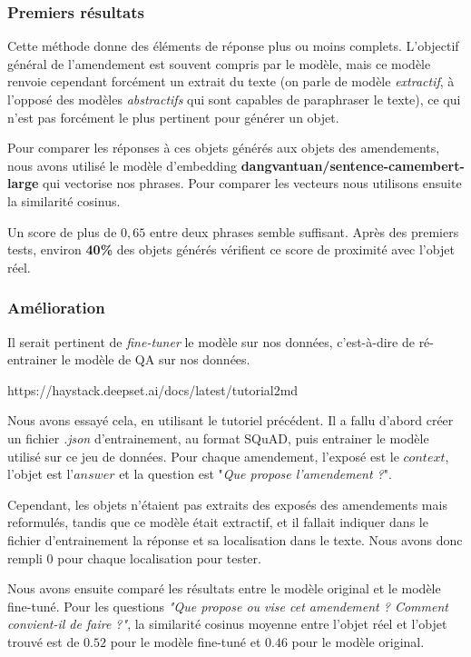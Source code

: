\documentclass{article}
\begin{document}
\subsubsection{Premiers résultats}

Cette méthode donne des éléments de réponse plus ou moins complets. L'objectif général de l'amendement est souvent compris par le modèle, mais ce modèle renvoie cependant forcément un extrait du texte (on parle de modèle \emph{extractif}, à l'opposé des modèles \emph{abstractifs} qui sont capables de paraphraser le texte), ce qui n'est pas forcément le plus pertinent pour générer un objet. 

Pour comparer les réponses à ces objets générés aux objets des amendements, nous avons utilisé le modèle d'embedding \textbf{dangvantuan/sentence-camembert-large} qui vectorise nos phrases. Pour comparer les vecteurs nous utilisons ensuite la similarité cosinus.

Un score de plus de $0,65$ entre deux phrases semble suffisant. Après des premiers tests, environ \textbf{40\%} des objets générés vérifient ce score de proximité avec l'objet réel.


\subsubsection{Amélioration}


Il serait pertinent de \emph{fine-tuner} le modèle sur nos données, c'est-à-dire de ré-entrainer le modèle de QA sur nos données. 

https://haystack.deepset.ai/docs/latest/tutorial2md

Nous avons essayé cela, en utilisant le tutoriel précédent. Il a fallu d'abord créer un fichier \emph{.json} d'entrainement, au format SQuAD, puis entrainer le modèle utilisé sur ce jeu de données. Pour chaque amendement, l'exposé est le $context$, l'objet est l'$answer$ et la question est "\emph{Que propose l'amendement ?}".

Cependant, les objets n'étaient pas extraits des exposés des amendements mais reformulés, tandis que ce modèle était extractif, et il fallait indiquer dans le fichier d'entrainement la réponse et sa localisation dans le texte. Nous avons donc rempli $0$ pour chaque localisation pour tester.


Nous avons ensuite comparé les résultats entre le modèle original et le modèle fine-tuné. Pour les questions \emph{"Que propose ou vise cet amendement ? Comment convient-il de faire ?"}, la similarité cosinus moyenne entre l'objet réel et l'objet trouvé est de $0.52$ pour le modèle fine-tuné et $0.46$ pour le modèle original. 
\\
\end{document}
